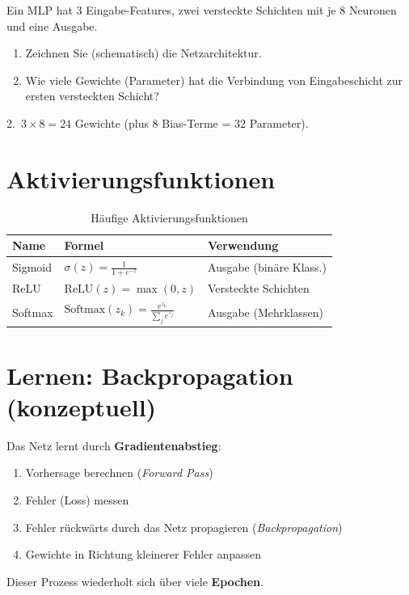 \begin{myexercise}
Ein MLP hat 3 Eingabe-Features, zwei versteckte Schichten mit je 8 Neuronen
und eine Ausgabe.
\begin{enumerate}
    \item Zeichnen Sie (schematisch) die Netzarchitektur.
    \item Wie viele Gewichte (Parameter) hat die Verbindung von Eingabeschicht zur ersten
          versteckten Schicht?
\end{enumerate}
\begin{myanswer}
2.\ $3 \times 8 = 24$ Gewichte (plus 8 Bias-Terme = 32 Parameter).
\end{myanswer}
\end{myexercise}

\section{Aktivierungsfunktionen}

\begin{table}[H]
\centering
\small
\begin{tabular}{p{2.8cm}p{4.2cm}p{4.2cm}}
\toprule
\textbf{Name} & \textbf{Formel} & \textbf{Verwendung} \\
\midrule
Sigmoid & $\sigma(z) = \frac{1}{1+e^{-z}}$ & Ausgabe (binäre Klass.) \\
ReLU & $\text{ReLU}(z) = \max(0, z)$ & Versteckte Schichten \\
Softmax & $\text{Softmax}(z_k) = \frac{e^{z_k}}{\sum_j e^{z_j}}$ & Ausgabe (Mehrklassen) \\
\bottomrule
\end{tabular}
\caption{Häufige Aktivierungsfunktionen}
\label{tab:aktivierung-15}
\end{table}

\section{Lernen: Backpropagation (konzeptuell)}

\begin{mydefinition}[Backpropagation]
Das Netz lernt durch \textbf{Gradientenabstieg}:
\begin{enumerate}
    \item Vorhersage berechnen (\emph{Forward Pass})
    \item Fehler (Loss) messen
    \item Fehler rückwärts durch das Netz propagieren (\emph{Backpropagation})
    \item Gewichte in Richtung kleinerer Fehler anpassen
\end{enumerate}
Dieser Prozess wiederholt sich über viele \textbf{Epochen}.
\end{mydefinition}

